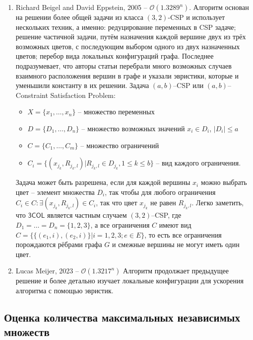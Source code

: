 \documentclass{article}
\begin{document}
\begin{enumerate}
\item Richard Beigel and David Eppstein, 2005\cite{3} -- $\mathcal{O}(1.3289^n)$.
\newline
Алгоритм основан на решении более общей задачи из класса $(3, 2)$-CSP
и использует нескольких техник, а именно: редуцирование переменных в CSP задаче;
решение частичной задачи, путём назначения каждой вершине двух из трёх возможных цветов, с последующим выбором одного из двух назначенных цветов;
перебор вида локальных конфигураций графа.
Последнее подразумевает, что авторы статьи перебрали много возможных случаев взаимного расположения вершин в графе и указали эвристики, которые
и уменьшили константу в их решении.
\newline\newline
Задача $(a, b)$--CSP или $(a, b)$--Constraint Satisfaction Problem:
\begin{itemize}
    \item $X = \{x_1,\hdots, x_n\}$ -- множество переменных
    \item $D = \{D_1,\hdots, D_n\}$ -- множество возможных значений $x_i\in D_i$, $|D_i|\leq a$
    \item $C = \{C_1,\hdots, C_m\}$ -- множество ограничений
    \item $C_i = \{(x_{j_k}, R_{j_k, l})| R_{j_k, l}\in D_{j_k}, 1\leq k \leq b\}$ -- вид каждого ограничения.
\end{itemize}
Задача может быть разрешена, если для каждой вершины $x_i$ можно выбрать цвет -- элемент множества $D_i$, так чтобы для любого ограничения
$C_i\in C: \exists (x_{j_k}, R_{j_k, l})\in C_i$, так что цвет $x_{j_k}$ не равен $R_{j_k, l}$. Легко заметить, что $\mathsf{3COL}$ является частным
случаем $(3, 2)$--CSP, где $D_1=\hdots=D_n=\{1, 2, 3\}$, а все ограничения $C$ имеют вид $C=\{\{(e_1, i), (e_2, i)\}|i=1,2,3; e\in E\}$,
то есть все ограничения порождаются рёбрами графа $G$ и смежные вершины не могут иметь один цвет.

\item Lucas Meijer, 2023\cite{4} -- $\mathcal{O}(1.3217^n)$
\newline
Алгоритм продолжает предыдущее решение\cite{3} и более детально изучает локальные конфигурации для ускорения алгоритма с помощью эвристик.
\end{enumerate}

\setcounter{section}{2}
\setcounter{subsection}{0}

\subsection{Оценка количества максимальных независимых множеств}
\end{document}

